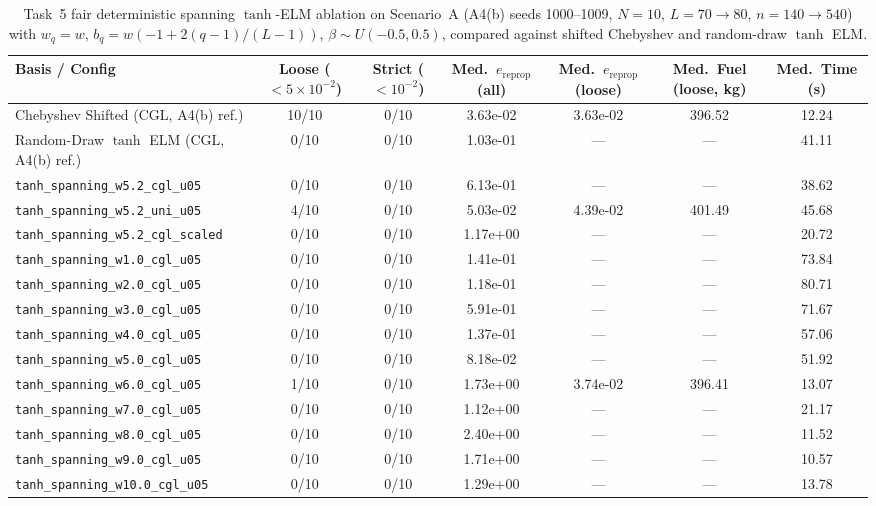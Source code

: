 \begin{table}[t]
\centering
\caption{Task~5 fair deterministic spanning $\tanh$-ELM ablation on Scenario~A (A4(b) seeds 1000--1009, $N=10$, $L=70 \to 80$, $n=140 \to 540$) with $w_q=w$, $b_q=w(-1+2(q-1)/(L-1))$, $\beta \sim U(-0.5,0.5)$, compared against shifted Chebyshev and random-draw $\tanh$ ELM.}
\label{tab:task5_tanh_spanning}
\begin{tabular}{lcccccc}
\toprule
Basis / Config & Loose ($<5\times 10^{-2}$) & Strict ($<10^{-2}$) & Med.\ $e_{\mathrm{reprop}}$ (all) & Med.\ $e_{\mathrm{reprop}}$ (loose) & Med.\ Fuel (loose, kg) & Med.\ Time (s) \\
\midrule
Chebyshev Shifted (CGL, A4(b) ref.) & 10/10 & 0/10 & 3.63e-02 & 3.63e-02 & 396.52 & 12.24 \\
Random-Draw $\tanh$ ELM (CGL, A4(b) ref.) & 0/10 & 0/10 & 1.03e-01 & --- & --- & 41.11 \\
\midrule
\texttt{tanh\_spanning\_w5.2\_cgl\_u05} & 0/10 & 0/10 & 6.13e-01 & --- & --- & 38.62 \\
\texttt{tanh\_spanning\_w5.2\_uni\_u05} & 4/10 & 0/10 & 5.03e-02 & 4.39e-02 & 401.49 & 45.68 \\
\texttt{tanh\_spanning\_w5.2\_cgl\_scaled} & 0/10 & 0/10 & 1.17e+00 & --- & --- & 20.72 \\
\texttt{tanh\_spanning\_w1.0\_cgl\_u05} & 0/10 & 0/10 & 1.41e-01 & --- & --- & 73.84 \\
\texttt{tanh\_spanning\_w2.0\_cgl\_u05} & 0/10 & 0/10 & 1.18e-01 & --- & --- & 80.71 \\
\texttt{tanh\_spanning\_w3.0\_cgl\_u05} & 0/10 & 0/10 & 5.91e-01 & --- & --- & 71.67 \\
\texttt{tanh\_spanning\_w4.0\_cgl\_u05} & 0/10 & 0/10 & 1.37e-01 & --- & --- & 57.06 \\
\texttt{tanh\_spanning\_w5.0\_cgl\_u05} & 0/10 & 0/10 & 8.18e-02 & --- & --- & 51.92 \\
\texttt{tanh\_spanning\_w6.0\_cgl\_u05} & 1/10 & 0/10 & 1.73e+00 & 3.74e-02 & 396.41 & 13.07 \\
\texttt{tanh\_spanning\_w7.0\_cgl\_u05} & 0/10 & 0/10 & 1.12e+00 & --- & --- & 21.17 \\
\texttt{tanh\_spanning\_w8.0\_cgl\_u05} & 0/10 & 0/10 & 2.40e+00 & --- & --- & 11.52 \\
\texttt{tanh\_spanning\_w9.0\_cgl\_u05} & 0/10 & 0/10 & 1.71e+00 & --- & --- & 10.57 \\
\texttt{tanh\_spanning\_w10.0\_cgl\_u05} & 0/10 & 0/10 & 1.29e+00 & --- & --- & 13.78 \\
\bottomrule
\end{tabular}
\end{table}
